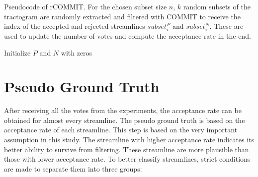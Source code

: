 \begin{algorithm}
    \caption{Pseudocode of rCOMMIT. For the chosen subset size $n$, $k$ random subsets of the tractogram are randomly extracted and filtered with COMMIT to 
    receive the index of the accepted and rejected streamlines $subset_i^P$ and $subset_i^N$. These are used to update the number of votes and compute the acceptance rate in the end.}
    
    
    
    \BlankLine
    \BlankLine
    Initialize $P$ and $N$ with zeros\\
    \label{fig:algo}
    
\end{algorithm}

\section{Pseudo Ground Truth}

After receiving all the votes from the experiments, the acceptance rate can be obtained for almost every streamline.
The pseudo ground truth is based on the acceptance rate of each streamline. This step is based on the very important assumption in this study.
The streamline with higher acceptance rate indicates its better ability to survive from filtering. These streamline are more plausible than those with lower acceptance rate.
To better classify streamlines, strict conditions are made to separate them into three groups:

